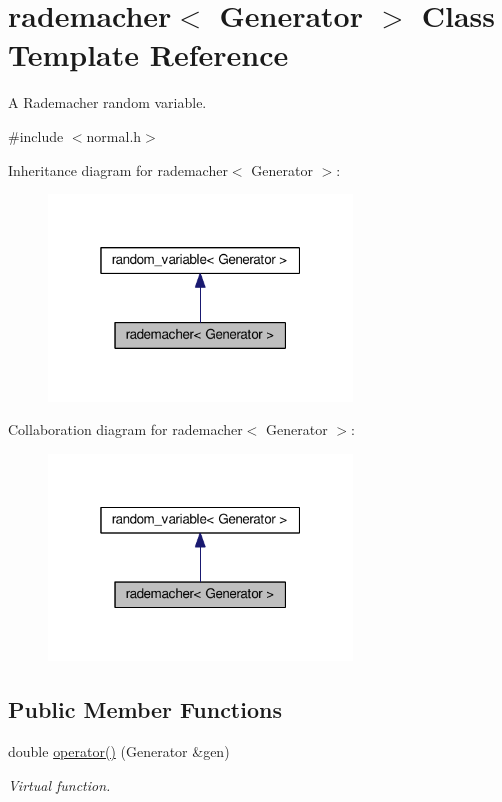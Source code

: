 \hypertarget{classrademacher}{}\section{rademacher$<$ Generator $>$ Class Template Reference}
\label{classrademacher}


A Rademacher random variable.  




{\ttfamily \#include $<$normal.\+h$>$}



Inheritance diagram for rademacher$<$ Generator $>$\+:\nopagebreak
\begin{figure}[H]
\begin{center}
\leavevmode
\includegraphics[width=229pt]{classrademacher__inherit__graph}
\end{center}
\end{figure}


Collaboration diagram for rademacher$<$ Generator $>$\+:\nopagebreak
\begin{figure}[H]
\begin{center}
\leavevmode
\includegraphics[width=229pt]{classrademacher__coll__graph}
\end{center}
\end{figure}
\subsection*{Public Member Functions}
\begin{DoxyCompactItemize}
\item 
double \hyperlink{classrademacher_ad497f5af40bc0d18d33d04c9e13976c1}{operator()} (Generator \&gen)\hypertarget{classrademacher_ad497f5af40bc0d18d33d04c9e13976c1}{}\label{classrademacher_ad497f5af40bc0d18d33d04c9e13976c1}

\begin{DoxyCompactList}\small\item\em Virtual function. \end{DoxyCompactList}\end{DoxyCompactItemize}
